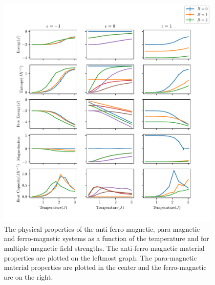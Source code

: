 \documentclass[a4paper, twocolumn]{article}
\begin{document}
\begin{figure}[t]
    \centering
    \includegraphics{pub/figures/physical_parameters_external_field.pdf}
    \caption{The physical properties of the anti-ferro-magnetic, para-magnetic %
        and ferro-magnetic systems as a function of the temperature and %
        for multiple magnetic field strengths. The anti-ferro-magnetic %
        material properties are plotted on the leftmost graph. The %
        para-magnetic material properties are plotted in the center and %
        the ferro-magnetic are on the right.}
    \label{fig:11}
\end{figure}
\end{document}

